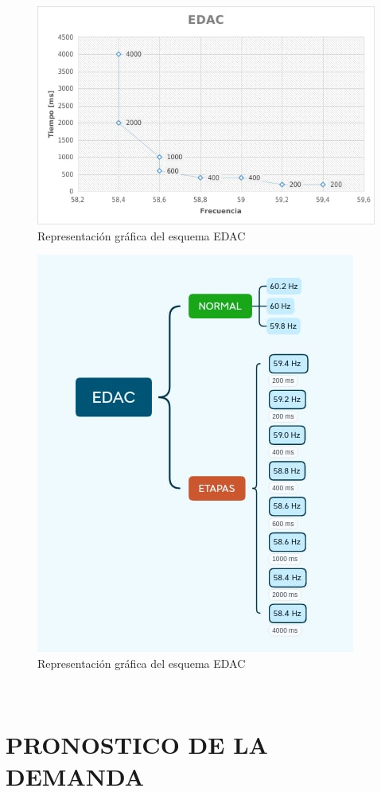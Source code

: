 \documentclass[a5paper]{book}%
\begin{document}
\begin{figure}[H]
  \centering
  \caption{Representación gráfica del esquema EDAC}
  \label{fig:edac1}
  \includegraphics[width=0.8\linewidth]{EDAC1}
\end{figure}

\begin{figure}[H]
  \centering
  \caption{Representación gráfica del esquema EDAC}
  \label{fig:edac2}
  \includegraphics[width=0.8\linewidth]{EDAC}
\end{figure}


\

\chapter{PRONOSTICO DE LA DEMANDA}
\end{document}
